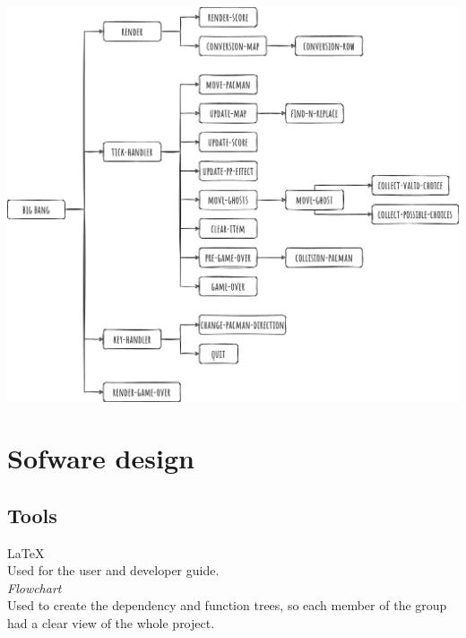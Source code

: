 \documentclass{article}
\begin{document}
\begin{center}
 \includegraphics[width=15cm]{images/function_tree.png}
\end{center}
 
\section{Sofware design}
\subsection{Tools}
\hspace{0.5cm}\LaTeX \\
Used for the user and developer guide.\\
 
\textit{Flowchart}\\
Used to create the dependency and function trees, so each member of the group had a clear view of the whole project.
\end{document}
